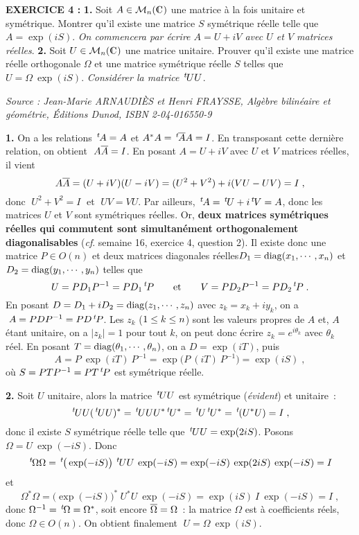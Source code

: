 \documentclass{article}
\begin{document}
\eject

{\bf EXERCICE 4 :}\msk
{\bf 1.} Soit $A\in{\cal M}_n(\cmat)$ une matrice \`a la fois unitaire et sym\'etrique. Montrer qu'il existe une matrice $S$ sym\'etrique r\'eelle telle que $A=\exp(iS)$. {\it On commencera par \'ecrire $A=U+iV$ avec $U$ et $V$ matrices r\'eelles}.\ssk
{\bf 2.} Soit $U\in{\cal M}_n(\cmat)$ une matrice unitaire. Prouver qu'il existe une matrice r\'eelle orthogonale $\Omega$ et une matrice sym\'etrique r\'eelle $S$ telles que $U=\Omega\>\exp(iS)$. {\it Consid\'erer la matrice $\,{}^t\!\!\>UU$}.

\msk

{\it Source : Jean-Marie ARNAUDI\`ES et Henri FRAYSSE, Alg\`ebre bilin\'eaire et g\'eom\'etrie, \'Editions Dunod, ISBN 2-04-016550-9}

\msk
\cl{- - - - - - - - - - - - - - - - - - - - - - - - - - - - - -}
\msk

{\bf 1.} On a les relations $\,{}^t\!\!\>A=A$ et $A^*A=\,{}^t\!\!\>\overline{A}A=I$. En transposant cette derni\`ere relation, on obtient $\;A\overline{A}=I$.\ssk\sect
En posant $A=U+iV$ avec $U$ et $V$ matrices r\'eelles, il vient\vv
$$A\overline{A}=(U+iV)(U-iV)=(U^2+V^2)+i(VU-UV)=I\;,$$
donc $\;U^2+V^2=I\;$ et $\;UV=VU$. Par ailleurs, $\,{}^t\!\!\>A=\,{}^t\!\!\>U+i\,{}^t\!\!\>V=A$, donc les matrices $U$ et $V$ sont sym\'etriques r\'eelles. Or, {\bf deux matrices sym\'etriques r\'eelles qui commutent sont simultan\'ement orthogonalement diagonalisables} ({\it cf}. semaine 16, exercice 4, question 2). Il existe donc une matrice $P\in O(n)$ et deux matrices diagonales r\'eelles\break $D_1=\mathop{\rm diag}\nolimits(x_1,\cdots,x_n)$ et $D_2=\mathop{\rm diag}\nolimits(y_1,\cdots,y_n)$ telles que\vv
$$U=PD_1P^{-1}=PD_1\,{}^t\!\!\>P\qquad{\rm et}\qquad V=PD_2P^{-1}=PD_2\,{}^t\!\!\>P\;.$$
En posant $D=D_1+iD_2=\mathop{\rm diag}\nolimits(z_1,\cdots,z_n)$ avec $z_k=x_k+iy_k$, on a $\;A=PDP^{-1}=PD\,{}^t\!\!\>P$. Les $z_k$ ($1\leq k\leq n$) sont les valeurs propres de $A$ et, $A$ \'etant unitaire, on a $|z_k|=1$ pour tout $k$, on peut donc \'ecrire $z_k=e^{i\theta_k}$ avec $\theta_k$ r\'eel. En posant $T=\mathop{\rm diag}\nolimits(\theta_1,\cdots,\theta_n)$, on a $D=\exp(iT)$, puis\vv
$$A=P\>\exp(iT)\>P^{-1}=\exp\big(P\>(iT)\>P^{-1}\big)=\exp(iS)\;,$$
o\`u $S=PTP^{-1}=PT\,{}^t\!\!\>P$ est sym\'etrique r\'eelle.

\msk
{\bf 2.} Soit $U$ unitaire, alors la matrice $\,{}^t\!\!\>UU$ est sym\'etrique ({\it \'evident}) et unitaire~:\vv
$$\t\>UU(\t\>UU)^*=\t\>UUU^*\t\>U^*=\t\>U\t\>U^*=\t\>(U^*U)=I\;,$$
donc il existe $S$ sym\'etrique r\'eelle telle que $\,{}^t\!\!\>UU=\exp(2iS)$.\msk\sect
Posons $\Omega=U\>\exp(-iS)$.\ssk{}
\sect
Donc\vvvv
$$\,{}^t\!\!\>\Omega\Omega=\,{}^t\!\!\>\big(\exp(-iS)\big)\>\,{}^t\!\!\>UU\>\exp(-iS)=\exp(-iS)\>\exp(2iS)\>\exp(-iS)=I$$
et\vvvv
$$\Omega^*\Omega=\big(\exp(-iS)\big)^*\>U^*U\>\exp(-iS)=\exp(iS)\>I\>\exp(-iS)=I\;,$$
donc $\Omega^{-1}=\,{}^t\!\!\>\Omega=\Omega^*$, soit encore $\overline{\Omega}=\Omega$~: la matrice $\Omega$ est \`a coefficients r\'eels, donc $\Omega\in O(n)$.\ssk\sect
On obtient finalement $\;U=\Omega\>\exp(iS)$.
\end{document}
